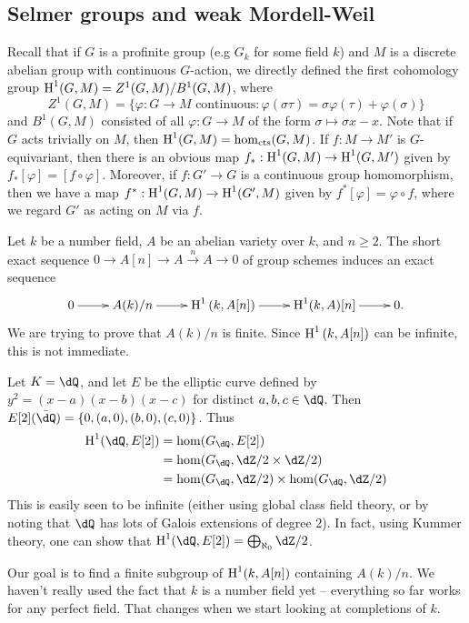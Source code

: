 \subsection{Selmer groups and weak Mordell-Weil}

Recall that if $G$ is a profinite group (e.g $G_k$ for some field $k$) and $M$ 
is a discrete abelian group with continuous $G$-action, we directly defined the 
first cohomology group $\operatorname{H}^1(G,M) = Z^1(G,M) / B^1(G,M)$, where 
\[
  Z^1(G,M) = \{\varphi:G\to M\text{ continuous}: \varphi(\sigma\tau) = \sigma \varphi(\tau)+\varphi(\sigma)\}
\]
and $B^1(G,M)$ consisted of all $\varphi:G\to M$ of the form 
$\sigma\mapsto \sigma x-x$. Note that if $G$ acts trivially on $M$, then 
$\operatorname{H}^1(G,M) = \hom_\text{cts}(G,M)$. If $f:M\to M'$ is $G$-equivariant, then 
there is an obvious map $f_*:\operatorname{H}^1(G,M)\to \operatorname{H}^1(G,M')$ given by 
$f_*[\varphi] = [f\circ \varphi]$. Moreover, if $f:G'\to G$ is a continuous 
group homomorphism, then we have a map $f^*:\operatorname{H}^1(G,M) \to \operatorname{H}^1(G',M)$ given 
by $f^*[\varphi] = \varphi\circ f$, where we regard $G'$ as acting on $M$ via 
$f$. 

Let $k$ be a number field, $A$ be an abelian variety over $k$, and 
$n\geqslant 2$. The short exact sequence $0\to A[n]\to A\xrightarrow n A \to 0$ 
of group schemes induces an exact sequence 
\[\xymatrix{
  0 \ar[r]  
    & A(k)/n \ar[r] 
    & \h^1\left(k,A[n]\right) \ar[r] 
    & \h^1(k,A)[n] \ar[r] 
    & 0 \text{.}
}\]
We are trying to prove that $A(k)/n$ is finite. Since $\operatorname{H}^1\left(k,A[n]\right)$ 
can be infinite, this is not immediate. 

\begin{example}
Let $K=\dQ$, and let $E$ be the elliptic curve defined by 
$y^2=(x-a)(x-b)(x-c)$ for distinct $a,b,c\in \dQ$. Then 
$E[2](\bar\dQ) = \{0,(a,0),(b,0),(c,0)\}$. Thus 
\begin{align*}
  \h^1(\dQ,E[2]) &= \hom(G_\dQ,E[2]) \\
    &= \hom(G_\dQ,\dZ/2\times \dZ/2) \\
    &= \hom(G_\dQ,\dZ/2) \times \hom(G_\dQ,\dZ/2)
\end{align*}
This is easily seen to be infinite (either using global class field theory, or 
by noting that $\dQ$ has lots of Galois extensions of degree $2$). In fact, 
using Kummer theory, one can show that 
$\h^1(\dQ,E[2]) = \bigoplus_{\aleph_0} \dZ/2$. 
\end{example}

Our goal is to find a finite subgroup of $\operatorname{H}^1(k,A[n])$ containing $A(k)/n$. 
We haven't really used the fact that $k$ is a number field yet -- everything so 
far works for any perfect field. That changes when we start looking at 
completions of $k$. 

